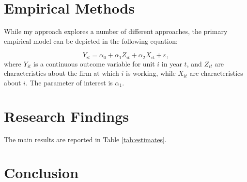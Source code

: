 \documentclass[12pt,english]{article}
\begin{document}
\section{Empirical Methods}\label{sec:methods}
While my approach explores a number of different approaches, the primary empirical model can be depicted in the following equation:

\begin{equation}
\label{eq:1}
Y_{it}=\alpha_{0} + \alpha_{1}Z_{it} + \alpha_{2} X_{it} + \varepsilon,
\end{equation}
where $Y_{it}$ is a continuous outcome variable for unit $i$ in year $t$, and $Z_{it}$ are characteristics about the firm at which $i$ is working, while $X_{it}$ are characteristics about $i$. The parameter of interest is $\alpha_{1}$.

\lipsum[1]

\section{Research Findings}\label{sec:results}
The main results are reported in Table \ref{tab:estimates}.

\lipsum[1]

\section{Conclusion}\label{sec:conclusion}
\lipsum[3]
\nocite{*} %

\vfill
\pagebreak{}
\begin{spacing}{1.0}


\end{spacing}

\vfill
\pagebreak{}
\clearpage
\end{document}
